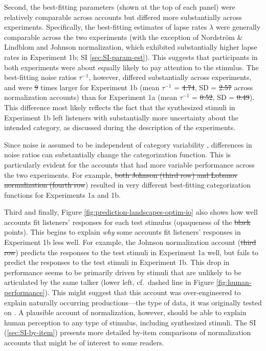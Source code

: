 \documentclass[preprint]{JASA}
\providecommand{\DIFadd}[1]{{\protect\color{blue}\uwave{#1}}} %
\providecommand{\DIFdel}[1]{{\protect\color{red}\sout{#1}}}                      %
\providecommand{\DIFaddbegin}{} %
\providecommand{\DIFaddend}{} %
\providecommand{\DIFdelbegin}{} %
\providecommand{\DIFdelend}{} %
\begin{document}
Second, the best-fitting parameters (shown at the top of each panel) were relatively comparable across accounts but differed more substantially across experiments. Specifically, the best-fitting estimates of lapse rates \(\lambda\) were generally comparable across the two experiments (with the exception of Nordström \& Lindblom and Johnson normalization, which exhibited substantially higher lapse rates in Experiment 1b; SI \ref{sec:SI-param-est}). This suggests that participants in both experiments were about equally likely to pay attention to the stimulus. The best-fitting noise ratios \(\tau^{-1}\), however, differed substantially across experiments, and were \DIFdelbegin \DIFdel{9 }\DIFdelend \DIFaddbegin \DIFadd{10 }\DIFaddend times larger for Experiment 1b (mean \(\tau^{-1}\) = \DIFdelbegin \DIFdel{4.74}\DIFdelend \DIFaddbegin \DIFadd{4.32}\DIFaddend , SD = \DIFdelbegin \DIFdel{2.57 }\DIFdelend \DIFaddbegin \DIFadd{2.52 }\DIFaddend across normalization accounts) than for Experiment 1a (mean \(\tau^{-1}\) = \DIFdelbegin \DIFdel{0.52}\DIFdelend \DIFaddbegin \DIFadd{0.42}\DIFaddend , SD = \DIFdelbegin \DIFdel{0.49}\DIFdelend \DIFaddbegin \DIFadd{0.46}\DIFaddend ). This difference most likely reflects the fact that the synthesized stimuli in Experiment 1b left listeners with substantially more uncertainty about the intended category, as discussed during the description of the experiments.

Since noise is assumed to be independent of category variability \citep[see also][]{feldman2009, kronrod2016}, differences in noise ratios can substantially change the categorization function. This is particularly evident for the accounts that had more variable performance across the two experiments. For example, \DIFdelbegin \DIFdel{both Johnson (third row) and Lobanov normalization (fourth row}\DIFdelend \DIFaddbegin \DIFadd{Johnson normalization (Panel B}\DIFaddend ) resulted in very different best-fitting categorization functions for Experiments 1a and 1b.

Third and finally, Figure \ref{fig:prediction-landscapes-optim-io} also shows how well accounts fit listeners' responses for each test stimulus (opaqueness of the \DIFdelbegin \DIFdel{black }\DIFdelend points). This begins to explain \emph{why} some accounts fit listeners' responses in Experiment 1b less well. For example, the Johnson normalization account (\DIFdelbegin \DIFdel{third row}\DIFdelend \DIFaddbegin \DIFadd{Panel B}\DIFaddend ) predicts the responses to the test stimuli in Experiment 1a well, but fails to predict the responses to the test stimuli in Experiment 1b. This drop in performance seems to be primarily driven by stimuli that are unlikely to be articulated by the same talker (lower left, cf.~dashed line in Figure \ref{fig:human-performance}). This might suggest that this account was over-engineered to explain naturally occurring productions---the type of data, it was originally tested on \citep{johnson2020}. A plausible account of normalization, however, should be able to explain human perception to any type of stimulus, including synthesized stimuli. The SI (\ref{sec:SI-by-item}) presents more detailed by-item comparisons of normalization accounts that might be of interest to some readers.
\end{document}
